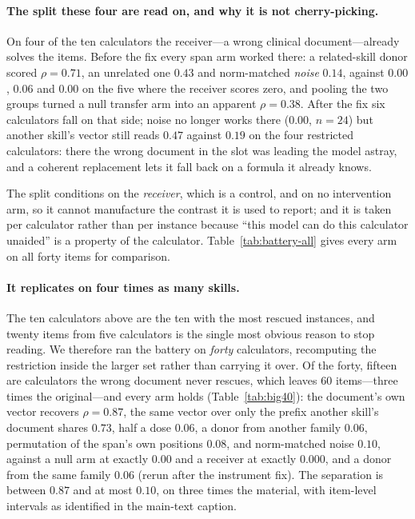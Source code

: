 \documentclass{article}
\begin{document}
\paragraph{The split these four are read on, and why it is not cherry-picking.}
On four of the ten calculators the receiver---a wrong clinical document---already
solves the items. Before the fix every span arm worked there: a related-skill
donor scored $\rho = 0.71$, an unrelated one $0.43$ and norm-matched
\emph{noise} $0.14$, against $0.00$, $0.06$ and $0.00$ on the five where the
receiver scores zero, and pooling the two groups turned a null transfer arm into
an apparent $\rho = 0.38$. After the fix six calculators fall on that side;
noise no longer works there ($0.00$, $n=24$) but another skill's vector still
reads $0.47$ against $0.19$ on the four restricted calculators: there the wrong
document in the slot was leading the model astray, and a coherent replacement
lets it fall back on a formula it already knows.

The split conditions on the \emph{receiver}, which is a control, and on no
intervention arm, so it cannot manufacture the contrast it is used to report; and
it is taken per calculator rather than per instance because ``this model can do
this calculator unaided'' is a property of the calculator. Table~\ref{tab:battery-all}
gives every arm on all forty items for comparison.

\paragraph{It replicates on four times as many skills.} The ten calculators
above are the ten with the most rescued instances, and twenty items from five
calculators is the single most obvious reason to stop reading. We therefore ran
the battery on \emph{forty} calculators, recomputing the restriction inside the
larger set rather than carrying it over. Of the forty, fifteen are calculators
the wrong document never rescues, which leaves $60$ items---three times the
original---and every arm holds (Table~\ref{tab:big40}): the document's own
vector recovers $\rho = 0.87$, the same vector over only the prefix another skill's document shares $0.73$, half a dose
$0.06$, a donor from another family $0.06$, permutation of the span's own
positions $0.08$, and norm-matched noise $0.10$, against a null arm at exactly
$0.00$ and a receiver at exactly $0.000$, and a donor from the same family
$0.06$ (rerun after the instrument fix). The separation is
between $0.87$ and at most $0.10$, on three times the material, with
item-level intervals as identified in the main-text caption.
\end{document}
